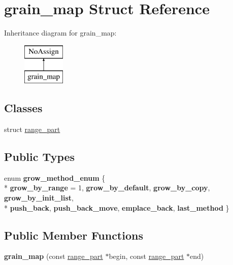 \hypertarget{structgrain__map}{}\section{grain\+\_\+map Struct Reference}
\label{structgrain__map}
Inheritance diagram for grain\+\_\+map\+:\begin{figure}[H]
\begin{center}
\leavevmode
\includegraphics[height=2.000000cm]{structgrain__map}
\end{center}
\end{figure}
\subsection*{Classes}
\begin{DoxyCompactItemize}
\item 
struct \hyperlink{structgrain__map_1_1range__part}{range\+\_\+part}
\end{DoxyCompactItemize}
\subsection*{Public Types}
\begin{DoxyCompactItemize}
\item 
\hypertarget{structgrain__map_a7f272bc26b7674b74396457f06199ace}{}enum {\bfseries grow\+\_\+method\+\_\+enum} \{ \\*
{\bfseries grow\+\_\+by\+\_\+range} = 1, 
{\bfseries grow\+\_\+by\+\_\+default}, 
{\bfseries grow\+\_\+by\+\_\+copy}, 
{\bfseries grow\+\_\+by\+\_\+init\+\_\+list}, 
\\*
{\bfseries push\+\_\+back}, 
{\bfseries push\+\_\+back\+\_\+move}, 
{\bfseries emplace\+\_\+back}, 
{\bfseries last\+\_\+method}
 \}\label{structgrain__map_a7f272bc26b7674b74396457f06199ace}

\end{DoxyCompactItemize}
\subsection*{Public Member Functions}
\begin{DoxyCompactItemize}
\item 
\hypertarget{structgrain__map_af241eeb5bb168ececf6e279230e448a1}{}{\bfseries grain\+\_\+map} (const \hyperlink{structgrain__map_1_1range__part}{range\+\_\+part} $\ast$begin, const \hyperlink{structgrain__map_1_1range__part}{range\+\_\+part} $\ast$end)\label{structgrain__map_af241eeb5bb168ececf6e279230e448a1}

\end{DoxyCompactItemize}
